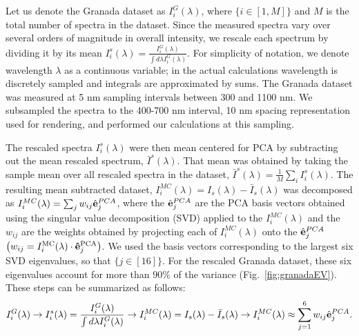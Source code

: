 \documentclass{jov}
\begin{document}

Let us denote the Granada dataset as $I^G_i(\lambda)$, where $\{i \in [1,M]\}$ and $M$ is the total number of spectra in the dataset. Since the measured spectra vary over several orders of magnitude in overall intensity, we rescale each spectrum by dividing it by its mean $I_i^s(\lambda) = \frac{I^G_i(\lambda)}{\int d\lambda I^G_i(\lambda)}$. For simplicity of notation, we denote wavelength $\lambda$ as a continuous variable; in the actual calculations wavelength is discretely sampled and integrals are approximated by sums.  The Granada dataset was measured at 5 nm sampling intervals between 300 and 1100 nm.  We subsampled the spectra to the 400-700 nm interval, 10 nm spacing representation used for rendering, and performed our calculations at this sampling.

The rescaled spectra $I_i^s(\lambda)$ were then mean centered for PCA by subtracting out the mean 
rescaled spectrum, $\bar{I}^{s}(\lambda)$. That mean was obtained
by taking the sample mean over all rescaled spectra in the dataset, $\bar{I}^{s}(\lambda) = \frac{1}{M}\sum_i{I_i^s(\lambda)}$. 
The resulting mean subtracted dataset, $I_i^{MC}(\lambda) = I_{s}(\lambda) - \bar{I}_{s}(\lambda)$
was decomposed as $I_i^{MC}(\lambda) = \sum_j w_{ij}\hat{{\bf e}}_j^{PCA}$, 
where the $\hat{{\bf e}}_j^{PCA}$ are the PCA basis vectors obtained using the
singular value decomposition (SVD) applied to the $I_i^{MC}(\lambda)$ and
the $w_{ij}$ are the weights obtained by projecting each of $I_i^{MC}(\lambda)$ onto the  $\hat{{\bf e}}_j^{PCA}$ $\left( w_{ij} = I_i^{\rm MC}(\lambda)\cdot {\bf \hat{e}}_j^{\rm PCA}\right)$.
We used the basis vectors corresponding to
the largest six SVD eigenvalues, so that $\{j \in [16]\}$.
For the rescaled Granada dataset, these six  eigenvalues account for more than $90\%$ of the variance (Fig.~\ref{fig:granadaEV}).
These steps
can be summarized as follows:
\begin{align}
I^G_i(\lambda) \rightarrow I_i^s(\lambda) = \frac{I^G_i(\lambda)}{\int d\lambda I^G_i(\lambda)} \rightarrow I_i^{MC}(\lambda) = I_{s}(\lambda) - \bar{I}_{s}(\lambda) \rightarrow I_i^{MC}(\lambda) \approx \sum_{j = 1}^6 w_{ij}\hat{{\bf e}}_j^{PCA}.
\end{align}
\end{document}
